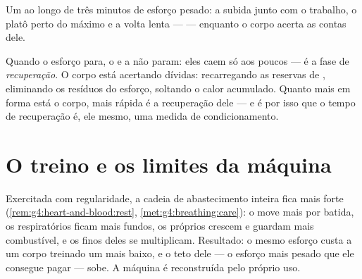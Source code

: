 \begin{omfigure}

{\small Um  ao longo de três minutos de esforço pesado: a subida
junto com o trabalho, o platô perto do máximo e a volta lenta ---
 --- enquanto o corpo acerta as contas dele.}
\end{omfigure}

\begin{definition}[Recuperação]\label{def:g7:organs-at-work:recovery}
Quando o esforço para, o  e a  não param: eles caem só
aos poucos --- é a fase de \emph{recuperação}. O
corpo está acertando dívidas: recarregando as reservas de ,
eliminando os resíduos do esforço, soltando o calor acumulado. Quanto
mais em forma está o corpo, mais rápida é a recuperação dele --- e é
por isso que o tempo de recuperação é, ele mesmo, uma medida de
condicionamento.
\end{definition}

\section{O treino e os limites da máquina}

\begin{proposition}\label{prop:g7:organs-at-work:training}
Exercitada com regularidade, a cadeia de abastecimento inteira fica
mais forte (\cref{rem:g4:heart-and-blood:rest},
\cref{met:g4:breathing:care}): o  move mais  por batida,
os  respiratórios ficam mais fundos, os próprios 
crescem e guardam mais combustível, e os  finos deles se
multiplicam. Resultado: o mesmo esforço custa a um corpo treinado um
 mais baixo, e o teto dele --- o esforço mais pesado que ele
consegue pagar --- sobe. A máquina é reconstruída pelo próprio uso.
\end{proposition}
\admitted

